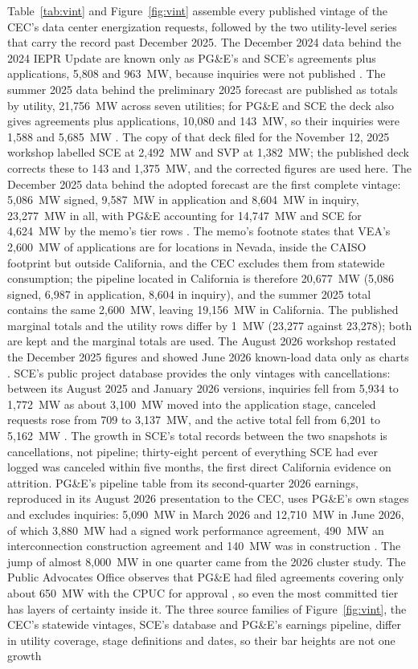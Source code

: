 Table~\ref{tab:vint} and Figure~\ref{fig:vint} assemble every published vintage of the CEC's data center energization requests, followed by the two utility-level series that carry the record past December 2025. The December 2024 data behind the 2024 IEPR Update are known only as PG\&E's and SCE's agreements plus applications, 5,808 and 963~MW, because inquiries were not published \citep{cec_prelim2025}. The summer 2025 data behind the preliminary 2025 forecast are published as totals by utility, 21,756~MW across seven utilities; for PG\&E and SCE the deck also gives agreements plus applications, 10,080 and 143~MW, so their inquiries were 1,588 and 5,685~MW \citep{cec_prelim2025}. The copy of that deck filed for the November 12, 2025 workshop labelled SCE at 2,492~MW and SVP at 1,382~MW; the published deck corrects these to 143 and 1,375~MW, and the corrected figures are used here. The December 2025 data behind the adopted forecast are the first complete vintage: 5,086~MW signed, 9,587~MW in application and 8,604~MW in inquiry, 23,277~MW in all, with PG\&E accounting for 14,747~MW and SCE for 4,624~MW by the memo's tier rows \citep{cec_dc_memo2026,cec_assembly2026}. The memo's footnote states that VEA's 2,600~MW of applications are for locations in Nevada, inside the CAISO footprint but outside California, and the CEC excludes them from statewide consumption; the pipeline located in California is therefore 20,677~MW (5,086 signed, 6,987 in application, 8,604 in inquiry), and the summer 2025 total contains the same 2,600~MW, leaving 19,156~MW in California. The published marginal totals and the utility rows differ by 1~MW (23,277 against 23,278); both are kept and the marginal totals are used. The August 2026 workshop restated the December 2025 figures and showed June 2026 known-load data only as charts \citep{cec_tn272026}. SCE's public project database provides the only vintages with cancellations: between its August 2025 and January 2026 versions, inquiries fell from 5,934 to 1,772~MW as about 3,100~MW moved into the application stage, canceled requests rose from 709 to 3,137~MW, and the active total fell from 6,201 to 5,162~MW \citep{sce_database2026}. The growth in SCE's total records between the two snapshots is cancellations, not pipeline; thirty-eight percent of everything SCE had ever logged was canceled within five months, the first direct California evidence on attrition. PG\&E's pipeline table from its second-quarter 2026 earnings, reproduced in its August 2026 presentation to the CEC, uses PG\&E's own stages and excludes inquiries: 5,090~MW in March 2026 and 12,710~MW in June 2026, of which 3,880~MW had a signed work performance agreement, 490~MW an interconnection construction agreement and 140~MW was in construction \citep{pge_dc_forecasting2026}. The jump of almost 8,000~MW in one quarter came from the 2026 cluster study. The Public Advocates Office observes that PG\&E had filed agreements covering only about 650~MW with the CPUC for approval \citep{cal_advocates2026}, so even the most committed tier has layers of certainty inside it. The three source families of Figure~\ref{fig:vint}, the CEC's statewide vintages, SCE's database and PG\&E's earnings pipeline, differ in utility coverage, stage definitions and dates, so their bar heights are not one growth 